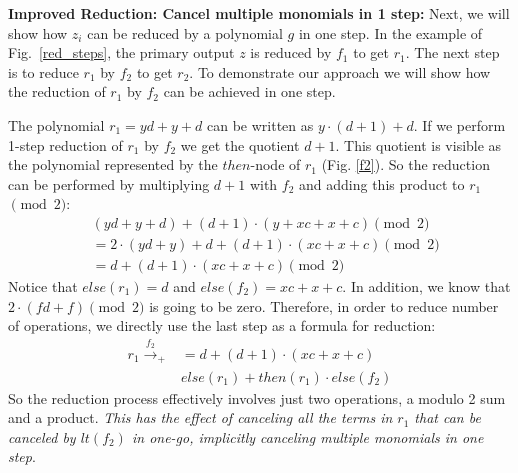 \par {\bf Improved Reduction: Cancel multiple monomials in 1 step:}
Next, we will show how $z_i$ can be reduced by a polynomial $g$ {in one step}. In the 
example of Fig.~\ref{red_steps}, the primary output $z$ is reduced by $f_1$ to get $r_1$. The next  step 
is to reduce $r_1$ by $f_2$ to get $r_2$. To demonstrate our
approach we will show how the reduction of $r_1$ by $f_2$ can be achieved in one step.
\par The polynomial $r_1 = yd + y + d$ can be written as $y\cdot(d+1) + d$. If we perform 1-step reduction of $r_1$ by $f_2$ we get
the quotient $d+1$. This quotient is visible as the polynomial 
represented by the $then$-node of $r_1$ (Fig. \ref{f2}). 
So the reduction can be performed by
multiplying $d + 1$ with $f_2$ and adding this 
product to $r_1$ $\pmod{2}$:
\begin{align*}
& (yd + y + d) + (d + 1)\cdot(y + xc + x + c) \pmod{2}\\
&= 2\cdot(yd + y) + d + (d+1)\cdot(xc + x + c) \pmod{2}\\
&= d + (d+1)\cdot(xc + x + c)  \pmod{2}
\end{align*}
Notice that $else(r_1)=d$ and $else(f_2)=xc+x+c$. In addition, we know that $2\cdot(fd + f) \pmod{2}$ is going
to be zero. Therefore, in order to reduce number of operations, we
directly use the last step as a formula for reduction: 
\begin{align*}
r_1 \xrightarrow{f_2}_+&= d + (d+1)\cdot(xc + x + c) \\
& else(r_1) + then(r_1)\cdot else(f_2)
\end{align*}
So the reduction process effectively involves just two operations, a
modulo 2 sum and a product. {\it This has the effect of canceling all
  the terms in $r_1$ that can be canceled by $lt(f_2)$ in one-go,
  implicitly canceling multiple monomials in one step}.  

